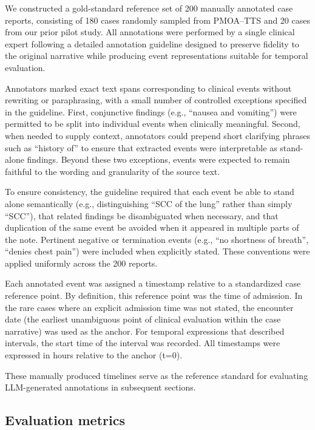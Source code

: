 \documentclass[pdflatex,sn-mathphys-num]{sn-jnl}%
\theoremstyle{thmstyleone}%
\theoremstyle{thmstyletwo}%
\theoremstyle{thmstylethree}%
\begin{document}
We constructed a gold-standard reference set of 200 manually annotated case reports, consisting of 180 cases randomly sampled from PMOA–TTS and 20 cases from our prior pilot study. All annotations were performed by a single clinical expert following a detailed annotation guideline designed to preserve fidelity to the original narrative while producing event representations suitable for temporal evaluation.

Annotators marked exact text spans corresponding to clinical events without rewriting or paraphrasing, with a small number of controlled exceptions specified in the guideline. First, conjunctive findings (e.g., “nausea and vomiting”) were permitted to be split into individual events when clinically meaningful. Second, when needed to supply context, annotators could prepend short clarifying phrases such as “history of” to ensure that extracted events were interpretable as stand-alone findings. Beyond these two exceptions, events were expected to remain faithful to the wording and granularity of the source text.

To ensure consistency, the guideline required that each event be able to stand alone semantically (e.g., distinguishing “SCC of the lung” rather than simply “SCC”), that related findings be disambiguated when necessary, and that duplication of the same event be avoided when it appeared in multiple parts of the note. Pertinent negative or termination events (e.g., “no shortness of breath”, “denies chest pain”) were included when explicitly stated. These conventions were applied uniformly across the 200 reports.

Each annotated event was assigned a timestamp relative to a standardized case reference point. By definition, this reference point was the time of admission. In the rare cases where an explicit admission time was not stated, the encounter date (the earliest unambiguous point of clinical evaluation within the case narrative) was used as the anchor. For temporal expressions that described intervals, the start time of the interval was recorded. All timestamps were expressed in hours relative to the anchor (t=0).

These manually produced timelines serve as the reference standard for evaluating LLM-generated annotations in subsequent sections.

\subsection{Evaluation metrics}
\end{document}
